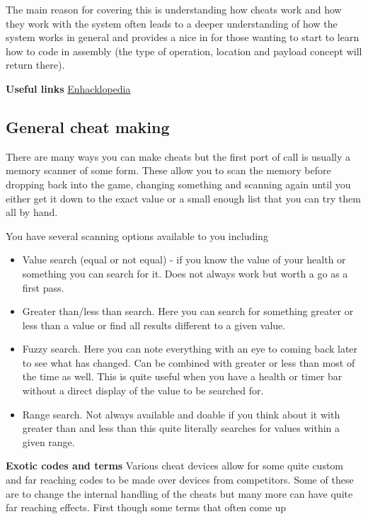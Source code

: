 \documentclass[
]{book}
\providecommand{\tightlist}{%
  \setlength{\itemsep}{0pt}\setlength{\parskip}{0pt}}
\begin{document}
The main reason for covering this is understanding how cheats work and how they work with the system often leads to a deeper understanding of how the system works in general and provides a nice in for those wanting to start to learn how to code in assembly (the type of operation, location and payload concept will return there).

\textbf{Useful links} \href{http://bsfree.org/hack/}{Enhacklopedia}

\hypertarget{general-cheat-making}{%
\subsection{General cheat making}\label{general-cheat-making}}

There are many ways you can make cheats but the first port of call is usually a memory scanner of some form. These allow you to scan the memory before dropping back into the game, changing something and scanning again until you either get it down to the exact value or a small enough list that you can try them all by hand.

You have several scanning options available to you including

\begin{itemize}
\tightlist
\item
  Value search (equal or not equal) - if you know the value of your health or something you can search for it. Does not always work but worth a go as a first pass.
\item
  Greater than/less than search. Here you can search for something greater or less than a value or find all results different to a given value.
\item
  Fuzzy search. Here you can note everything with an eye to coming back later to see what has changed. Can be combined with greater or less than most of the time as well. This is quite useful when you have a health or timer bar without a direct display of the value to be searched for.
\item
  Range search. Not always available and doable if you think about it with greater than and less than this quite literally searches for values within a given range.
\end{itemize}

\textbf{Exotic codes and terms} Various cheat devices allow for some quite custom and far reaching codes to be made over devices from competitors. Some of these are to change the internal handling of the cheats but many more can have quite far reaching effects. First though some terms that often come up
\end{document}
